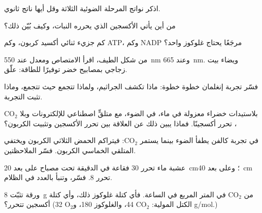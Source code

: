 \begin{exercise}[$\star$]\label{exo:g12:photosynthesis:3}
اذكر نواتج المرحلة الضوئية الثلاثة وقل أيها ناتج ثانوي.
\end{exercise}

\begin{exercise}[$\star$]\label{exo:g12:photosynthesis:4}
من أين يأتي الأكسجين الذي يحرره النبات، وكيف بُيّن ذلك؟
\end{exercise}

\begin{exercise}[$\star$]\label{exo:g12:photosynthesis:5}
كم جزيء ثنائي أكسيد كربون، وكم ATP، وكم NADP مرجَعًا يحتاج غلوكوز
واحد؟
\end{exercise}

\begin{exercise}[$\star\star$]\label{exo:g12:photosynthesis:6}
من شكل الطيف، اقرأ الامتصاص ومعدل  عند \qty{550}{nm}
وعند \qty{665}{nm}. ويضاء بيت زجاجي بمصابيح خضر توفيرًا للطاقة: علّق.
\end{exercise}

\begin{exercise}[$\star\star$]\label{exo:g12:photosynthesis:7}
فسّر تجربة إنغلمان خطوة خطوة: ماذا تكشف الجراثيم، ولماذا تتجمع حيث
تتجمع، وماذا تثبت التجربة.
\end{exercise}

\begin{exercise}[$\star\star$]\label{exo:g12:photosynthesis:8}
بلاستيدات خضراء معزولة في ماء، في الضوء، مع متلقٍّ اصطناعي
للإلكترونات وبلا $\mathrm{CO_2}$، تحرر أكسجينًا. فماذا يبين ذلك عن
العلاقة بين تحرر الأكسجين وتثبيت الكربون؟
\end{exercise}

\begin{exercise}[$\star\star$]\label{exo:g12:photosynthesis:9}
في تجربة كالفن يطفأ الضوء بينما يستمر $\mathrm{CO_2}$: فيتراكم الحمض
الثلاثي الكربون ويختفي المتلقي الخماسي الكربون. فسّر الملاحظتين.
\end{exercise}

\begin{exercise}[$\star\star$]\label{exo:g12:photosynthesis:10}
عشبة ماء تحرر 30 فقاعة في الدقيقة تحت مصباح على بعد
\qty{20}{cm}؛ وعلى بعد \qty{40}{cm} تحرر 8. فسّر، وتنبأ بالعدد في
الظلام.
\end{exercise}

\begin{exercise}[$\star\star$]\label{exo:g12:photosynthesis:11}
ورقة تثبّت \qty{8}{g} من $\mathrm{CO_2}$ في المتر المربع في الساعة.
فأي كتلة غلوكوز ذلك، وأي كتلة أكسجين تتحرر؟
(الكتل المولية: $\mathrm{CO_2}$ 44، والغلوكوز 180، و$\mathrm{O_2}$ 32
\unit{g/mol}.)
\end{exercise}

